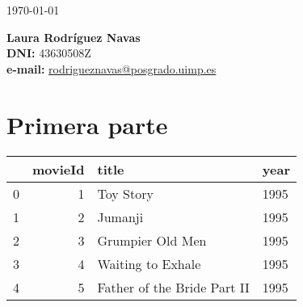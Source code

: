 \documentclass{uimppracticas}
\begin{document}
	
\frontmatter


\begin{center}
\large \today
\end{center}

\vspace{40mm}

\begin{flushright}
 	{\bf Laura Rodríguez Navas}\\
 	\textbf{DNI:} 43630508Z\\
 	\textbf{e-mail:} \href{rodrigueznavas@posgrado.uimp.es}{rodrigueznavas@posgrado.uimp.es}
\end{flushright}

\newpage



\mainmatter

\setlength\parskip{2.5ex}

\section*{Primera parte}

\begin{tabular}{lrll}
	\toprule
	{} &  movieId &                        title &  year \\
	\midrule
	0 &        1 &                    Toy Story &  1995 \\
	1 &        2 &                      Jumanji &  1995 \\
	2 &        3 &             Grumpier Old Men &  1995 \\
	3 &        4 &            Waiting to Exhale &  1995 \\
	4 &        5 &  Father of the Bride Part II &  1995 \\
	\bottomrule
\end{tabular}


%
%
\end{document}
